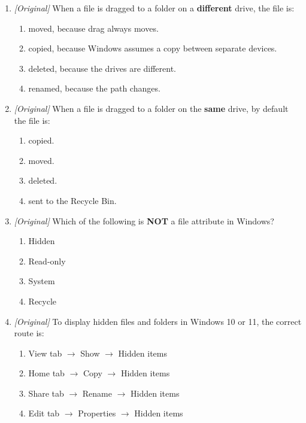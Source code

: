 \begin{enumerate}[label=\textbf{Q\arabic*.}, leftmargin=*]
\begin{enumerate}[label=\Alph*.]
    \item Copy the file
    \item Move the file
    \item Rename the file
    \item Delete the file
  \end{enumerate}
\item \textit{[Original]} When a file is dragged to a folder on a
  \textbf{different} drive, the file is:
  \begin{enumerate}[label=\Alph*.]
    \item moved, because drag always moves.
    \item copied, because Windows assumes a copy between separate devices.
    \item deleted, because the drives are different.
    \item renamed, because the path changes.
  \end{enumerate}
\item \textit{[Original]} When a file is dragged to a folder on the
  \textbf{same} drive, by default the file is:
  \begin{enumerate}[label=\Alph*.]
    \item copied.
    \item moved.
    \item deleted.
    \item sent to the Recycle Bin.
  \end{enumerate}
\item \textit{[Original]} Which of the following is \textbf{NOT} a file
  attribute in Windows?
  \begin{enumerate}[label=\Alph*.]
    \item Hidden
    \item Read-only
    \item System
    \item Recycle
  \end{enumerate}
\item \textit{[Original]} To display hidden files and folders in Windows 10 or
  11, the correct route is:
  \begin{enumerate}[label=\Alph*.]
    \item View tab $\rightarrow$ Show $\rightarrow$ Hidden items
    \item Home tab $\rightarrow$ Copy $\rightarrow$ Hidden items
    \item Share tab $\rightarrow$ Rename $\rightarrow$ Hidden items
    \item Edit tab $\rightarrow$ Properties $\rightarrow$ Hidden items

\end{enumerate}
\end{enumerate}
